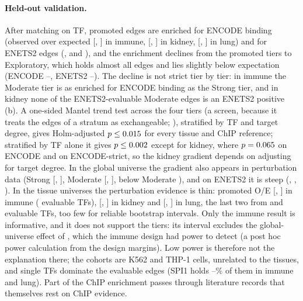 \paragraph{Held-out validation.}
After matching on TF, promoted edges are enriched for ENCODE binding (observed over expected \nGovOeEncImm{} [\nGovOeEncImmLo{}, \nGovOeEncImmHi{}] in immune, \nGovOeEncKid{} [\nGovOeEncKidLo{}, \nGovOeEncKidHi{}] in kidney, \nGovOeEncLung{} [\nGovOeEncLungLo{}, \nGovOeEncLungHi{}] in lung) and for ENETS2 edges (\nGovOeEnetImm{}, \nGovOeEnetKid{} and \nGovOeEnetLung{}), and the enrichment declines from the promoted tiers to Exploratory, which holds almost all edges and lies slightly below expectation (ENCODE \nGovExplEncMin{}--\nGovExplEncMax{}, ENETS2 \nGovExplEnetMin{}--\nGovExplEnetMax{}). The decline is not strict tier by tier: in immune the Moderate tier is as enriched for ENCODE binding as the Strong tier, and in kidney none of the \nGovModEnetKidNeval{} ENETS2-evaluable Moderate edges is an ENETS2 positive (b).
A one-sided Mantel trend test across the four tiers (a screen, because it treats the edges of a stratum as exchangeable; ), stratified by TF and target degree, gives Holm-adjusted $p\le 0.015{}$ for every tissue and ChIP reference; stratified by TF alone it gives $p\le0.002{}$ except for kidney, where $p=0.065{}$ on ENCODE and \nGovTrendTfKidStrict{} on ENCODE-strict, so the kidney gradient depends on adjusting for target degree.
In the global universe the gradient also appears in perturbation data (Strong \nGovGlobPertStrong{} [\nGovGlobPertStrongLo{}, \nGovGlobPertStrongHi{}], Moderate \nGovGlobPertMod{} [\nGovGlobPertModLo{}, \nGovGlobPertModHi{}], below Moderate \nGovGlobPertBelow{}), and on ENETS2 it is steep (\nGovGlobEnetStrong{}, \nGovGlobEnetMod{}, \nGovGlobEnetBelow{}).
In the tissue universes the perturbation evidence is thin: promoted O/E \nGovOePertImm{} [\nGovOePertImmLo{}, \nGovOePertImmHi{}] in immune (\nGovPertNtfImm{} evaluable TFs), \nGovOePertKid{} [\nGovOePertKidLo{}, \nGovOePertKidHi{}] in kidney and \nGovOePertLung{} [\nGovOePertLungLo{}, \nGovOePertLungHi{}] in lung, the last two from \nGovPertNtfKid{} and \nGovPertNtfLung{} evaluable TFs, too few for reliable bootstrap intervals.
Only the immune result is informative, and it does not support the tiers: its interval excludes the global-universe effect of \nGovPertGlobOe{}, which the immune design had power \nGovPertPowImm{} to detect (a post hoc power calculation from the design margins).
Low power is therefore not the explanation there; the cohorts are K562 and THP-1 cells, unrelated to the tissues, and single TFs dominate the evaluable edges (SPI1 holds \nGovPertTopTfPctMin{}--\nGovPertTopTfPctMax{}\% of them in immune and lung).
Part of the ChIP enrichment passes through literature records that themselves rest on ChIP evidence.


